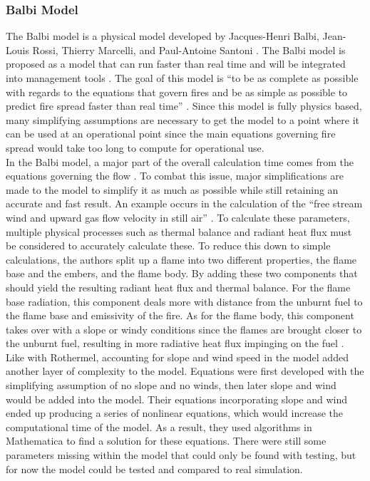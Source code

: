 \documentclass{article}
\begin{document}
\subsubsection{Balbi Model}
\indent The Balbi model is a physical model developed by Jacques-Henri Balbi, Jean-Louis Rossi, Thierry Marcelli, and Paul-Antoine Santoni \cite{Balbi2007}. The Balbi model is proposed as a model that can run faster than real time and will be integrated into management tools \cite{Balbi2007}. The goal of this model is “to be as complete as possible with regards to the equations that govern fires and be as simple as possible to predict fire spread faster than real time” \cite{Balbi2007}. Since this model is fully physics based, many simplifying assumptions are necessary to get the model to a point where it can be used at an operational point since the main equations governing fire spread would take too long to compute for operational use. \\
\indent In the Balbi model, a major part of the overall calculation time comes from the equations governing the flow \cite{Balbi2007}. To combat this issue, major simplifications are made to the model to simplify it as much as possible while still retaining an accurate and fast result. An example occurs in the calculation of the “free stream wind and upward gas flow velocity in still air” \cite{Balbi2007}. To calculate these parameters, multiple physical processes such as thermal balance and radiant heat flux must be considered to accurately calculate these. To reduce this down to simple calculations, the authors split up a flame into two different properties, the flame base and the embers, and the flame body. By adding these two components that should yield the resulting radiant heat flux and thermal balance. For the flame base radiation, this component deals more with distance from the unburnt fuel to the flame base and emissivity of the fire. As for the flame body, this component takes over with a slope or windy conditions since the flames are brought closer to the unburnt fuel, resulting in more radiative heat flux impinging on the fuel \cite{Balbi2007}. \\
\indent Like with Rothermel, accounting for slope and wind speed in the model added another layer of complexity to the model. Equations were first developed with the simplifying assumption of no slope and no winds, then later slope and wind would be added into the model. Their equations incorporating slope and wind ended up producing a series of nonlinear equations, which would increase the computational time of the model. As a result, they used algorithms in Mathematica to find a solution for these equations. There were still some parameters missing within the model that could only be found with testing, but for now the model could be tested and compared to real simulation. \\
\end{document}
